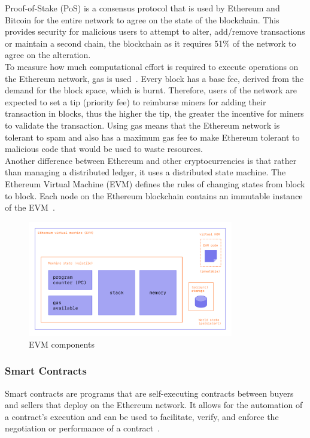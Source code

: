 \noindent Proof-of-Stake (PoS) is a consensus protocol that is used by Ethereum and Bitcoin for the entire network to agree on the state of the blockchain. This provides security for malicious users to attempt to alter, add/remove transactions or maintain a second chain, the blockchain as it requires 51\% of the network to agree on the alteration.
\\[5mm]
To measure how much computational effort is required to execute operations on the Ethereum network, gas is used~\cite{noauthor_gas_nodate}. Every block has a base fee, derived from the demand for the block space, which is burnt. Therefore, users of the network are expected to set a tip (priority fee) to reimburse miners for adding their transaction in blocks, thus the higher the tip, the greater the incentive for miners to validate the transaction. Using gas means that the Ethereum network is tolerant to spam and also has a maximum gas fee to make Ethereum tolerant to malicious code that would be used to waste resources.
\\[5mm]
Another difference between Ethereum and other cryptocurrencies is that rather than managing a distributed ledger, it uses a distributed state machine. The Ethereum Virtual Machine (EVM) defines the rules of changing states from block to block. Each node on the Ethereum blockchain contains an immutable instance of the EVM~\cite{noauthor_ethereum_nodate}.

\begin{figure}[!htb]
    \centering
    \includegraphics[width=0.8\textwidth]{background/Images/evm.png}
    \caption{EVM components~\cite{noauthor_ethereum_nodate}}
\end{figure}

\subsubsection{Smart Contracts}
Smart contracts are programs that are self-executing contracts between buyers and sellers that deploy on the Ethereum network. It allows for the automation of a contract's execution and can be used to facilitate, verify, and enforce the negotiation or performance of a contract~\cite{noauthor_introduction_nodate, noauthor_smart_nodate}.

